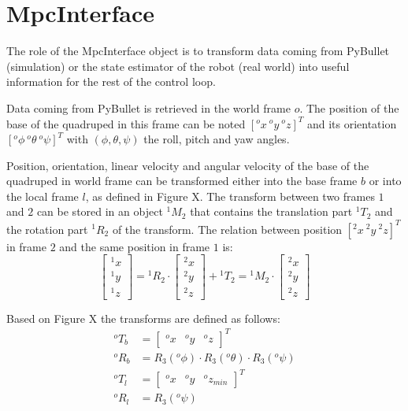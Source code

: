\documentclass[a4paper,11pt]{article}
\newcommand{\fM}[2]{{}^{#1}\!M_{#2}}
\begin{document}

\section*{MpcInterface}

The role of the MpcInterface object is to transform data coming from PyBullet (simulation) or the state estimator of the robot (real world) into useful information for the rest of the control loop. 

Data coming from PyBullet is retrieved in the world frame $o$. The position of the base of the quadruped in this frame can be noted $[{}^o\!x ~ {}^o\!y ~ {}^o\!z]^T$ and its orientation $[{}^o\!\phi ~ {}^o\!\theta ~ {}^o\!\psi]^T$ with $(\phi, \theta, \psi)$ the roll, pitch and yaw angles.

Position, orientation, linear velocity and angular velocity of the base of the quadruped in world frame can be transformed either into the base frame $b$ or into the local frame $l$, as defined in Figure X. The transform between two frames $1$ and $2$ can be stored in an object $\fM{1}{2}$ that contains the translation part $^1\!T_2$ and the rotation part $^1\!R_2$ of the transform. The relation between position $[^2\!x ~ ^2\!y ~ ^2\!z]^T$ in frame $2$ and the same position in frame $1$ is:
\begin{equation}
\begin{bmatrix}^1\!x \\ ^1\!y \\ ^1\!z \end{bmatrix} = {}^1\!R_2 \cdot \begin{bmatrix}^2\!x \\ ^2\!y \\ ^2\!z\end{bmatrix} + {}^1\!T_2 = \fM{1}{2} \cdot \begin{bmatrix}^2\!x \\ ^2\!y \\ ^2\!z\end{bmatrix}
\end{equation}  

Based on Figure X the transforms are defined as follows: 
\begin{align}
{}^o\!T_b &= \begin{bmatrix} {}^o\!x & {}^o\!y & {}^o\!z \end{bmatrix}^T \\
{}^o\!R_b &= R_3({}^o\phi) \cdot R_3({}^o\theta) \cdot R_3({}^o\psi) \\
{}^o\!T_l &= \begin{bmatrix} {}^o\!x & {}^o\!y & {}^o\!z_{min} \end{bmatrix}^T \\
{}^o\!R_l &= R_3({}^o\psi)
\end{align}
\end{document}
